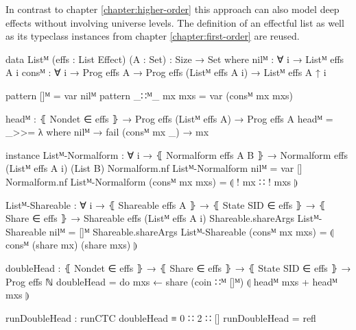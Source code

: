In contrast to chapter \ref{chapter:higher-order} this approach can also model
deep effects without involving universe levels.
The definition of an effectful list as well as its typeclass instances from
chapter \ref{chapter:first-order} are reused.

\begin{code}[hide]
data Listᴹ (effs : List Effect) (A : Set) : {Size} → Set where
  nilᴹ  : ∀ {i} → Listᴹ effs A {i}
  consᴹ : ∀ {i} → Prog effs A → Prog effs (Listᴹ effs A {i}) → Listᴹ effs A {↑ i}

pattern []ᴹ         = var nilᴹ
pattern _∷ᴹ_ mx mxs = var (consᴹ mx mxs)

headᴹ : ⦃ Nondet ∈ effs ⦄ → Prog effs (Listᴹ effs A) → Prog effs A
headᴹ = _>>= λ where
  nilᴹ         → fail
  (consᴹ mx _) → mx

instance
  Listᴹ-Normalform : ∀ {i} → ⦃ Normalform effs A B ⦄ → Normalform effs (Listᴹ effs A {i}) (List B)
  Normalform.nf Listᴹ-Normalform nilᴹ           = var []
  Normalform.nf Listᴹ-Normalform (consᴹ mx mxs) = ⦇ ! mx ∷ ! mxs ⦈

  Listᴹ-Shareable : ∀ {i} → ⦃ Shareable effs A ⦄ → ⦃ State SID ∈ effs ⦄ → ⦃ Share ∈ effs ⦄ → Shareable effs (Listᴹ effs A {i})
  Shareable.shareArgs Listᴹ-Shareable nilᴹ           = []ᴹ
  Shareable.shareArgs Listᴹ-Shareable (consᴹ mx mxs) = ⦇ consᴹ (share mx) (share mxs) ⦈
\end{code}
\begin{code}
doubleHead : ⦃ Nondet ∈ effs ⦄ → ⦃ Share ∈ effs ⦄ → ⦃ State SID ∈ effs ⦄ →
  Prog effs ℕ
doubleHead = do mxs ← share (coin ∷ᴹ []ᴹ)
                ⦇ headᴹ mxs + headᴹ mxs ⦈

runDoubleHead : runCTC doubleHead ≡ 0 ∷ 2 ∷ []
runDoubleHead = refl
\end{code}
